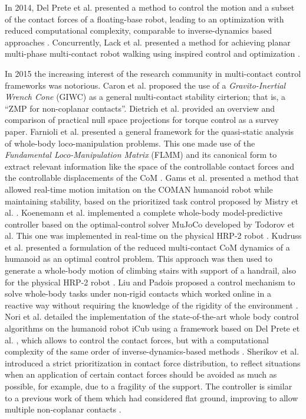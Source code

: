 	In 2014, Del Prete et al. \cite{DelPrete_IROS2014} presented a method to control the motion and
	a subset of the contact forces of a floating-base robot, leading to an optimization with reduced
	computational complexity, comparable to inverse-dynamics based approaches \cite{DelPrete_IROS2014}.
	Concurrently, Lack et al. \cite{Lack_ICRA2014} presented a method for achieving planar multi-phase
	multi-contact robot walking using inspired control and optimization \cite{Lack_ICRA2014}.
	
	In 2015 the increasing interest of the research community in multi-contact control frameworks was
	notorious.
	Caron et al. \cite{Caron_RSS2015} proposed the use of a \emph{Gravito-Inertial Wrench Cone} (GIWC)
	as a general multi-contact stability cirterion; that is, a ``ZMP for non-coplanar contacts''.
	Dietrich et al. \cite{Dietrich_IJRR2015} provided an overview and comparison of practical null space
	projections for torque control as a survey paper.
	Farnioli et al. \cite{Farnioli_ICRA2015} presented a general framework for the quasi-static analysis
	of whole-body loco-manipulation problems.
	This one made use of the \emph{Fundamental Loco-Manipulation Matrix} (FLMM) and its canonical form
	to extract relevant information like the space of the controllable contact forces and the controllable
	displacements of the CoM \cite{Farnioli_ICRA2015}.
	Gams et al. \cite{Gams_Robotica2015} presented a method that allowed real-time motion imitation on
	the COMAN humanoid robot while maintaining stability, based on the prioritized task control proposed
	by Mistry et al. \cite{Mistry_IROS2007}.
	Koenemann et al. \cite{Koenemann_IROS2015} implemented a complete whole-body model-predictive controller
	based on the optimal-control solver MuJoCo developed by Todorov et al. \cite{Todorov_IROS2012}
	This one was implemented in real-time on the physical HRP-2 robot \cite{Koenemann_IROS2015}.
	Kudruss et al. \cite{Kudruss_Humanoids2015} presented a formulation of the reduced multi-contact CoM
	dynamics of a humanoid as an optimal control problem.
	This approach was then used to generate a whole-body motion of climbing stairs with support of a
	handrail, also for the physical HRP-2 robot \cite{Kudruss_Humanoids2015}.
	Liu and Padois \cite{LiuM_IROS2015} proposed a control mechanism to solve whole-body tasks under
	non-rigid contacts which worked online in a reactive way without requiring the knowledge of the
	rigidity of the environment \cite{LiuM_IROS2015}.
	Nori et al. \cite{Nori_FrontRobAI2015} detailed the implementation of the state-of-the-art whole
	body control algorithms on the humanoid robot iCub using a framework based on Del Prete et al.
	\cite{DelPrete_IROS2014}, which allows to control the contact forces, but with a computational
	complexity of the same order of inverse-dynamics-based methods \cite{Nori_FrontRobAI2015}.
	Sherikov et al. \cite{Sherikov_Humanoids2015} introduced a strict prioritization in contact force
	distribution, to reflect situations when an application of certain contact forces should be avoided
	as much as possible, for example, due to a fragility of the support.
	The controller is similar to a previous work of them \cite{Sherikov_Humanoids2014}
	which had considered flat ground, improving to allow multiple non-coplanar contacts
	\cite{Sherikov_Humanoids2015}.
	
